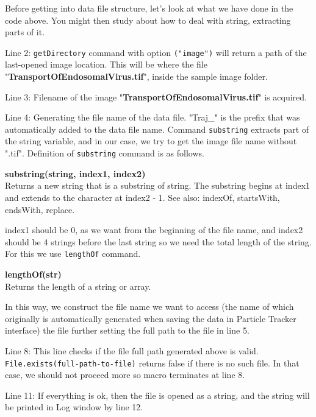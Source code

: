 \documentclass[11pt,a4paper,oneside]{report}
\newenvironment{indentCom}%
{\begin{list}{}%
         {\setlength{\leftmargin}{1em}}%
         \item[]%
}
{\end{list}}
\newcommand{\ilcom}[1]{\texttt{\small#1}}
\begin{document}
Before getting into data file structure, let's look at what we have done in the code above. 
You might then study about how to deal with string, extracting parts of it. 
\begin{itemize}
\item Line 2: \ilcom{getDirectory} command with option \ilcom{("image")} 
will return a path of the last-opened image location. 
This will be where the file "\textbf{TransportOfEndosomalVirus.tif}", inside the sample image folder. 
\item Line 3: Filename of the image  "\textbf{TransportOfEndosomalVirus.tif}" is acquired. 
\item Line 4: Generating the file name of the data file. "Traj\_" is the prefix that was automatically added to 
the data file name. Command \ilcom{substring} extracts part of the string variable, and in our case, 
we try to get the image file name without ".tif". Definition of \ilcom{substring} command is as follows.

\begin{indentCom}
\textbf{substring(string, index1, index2)}\\
Returns a new string that is a substring of string. The substring begins at index1 and extends to the character at index2 - 1. 
See also: indexOf, startsWith, endsWith, replace.
\end{indentCom}

index1 should be 0, as we want from the beginning of the file name, and index2 should be 4 strings before the 
last string so we need the total length of the string. For this we use \ilcom{lengthOf} command. 
\begin{indentCom}
\textbf{lengthOf(str)}\\
Returns the length of a string or array.
\end{indentCom}
In this way, we construct the file name we want to access 
(the name of which originally is automatically generated when saving the data in Particle Tracker interface) 
the file further setting the full path to the file in line 5. 
\item Line 8: This line checks if the file full path generated above is valid. 
\ilcom{File.exists(full-path-to-file)} returns false if there is no such file. In that case, we should not proceed more so macro terminates at line 8. 
\item Line 11: If everything is ok, then the file is opened as a string, 
and the string will be printed in Log window by line 12. 
\end{itemize}
\end{document}
